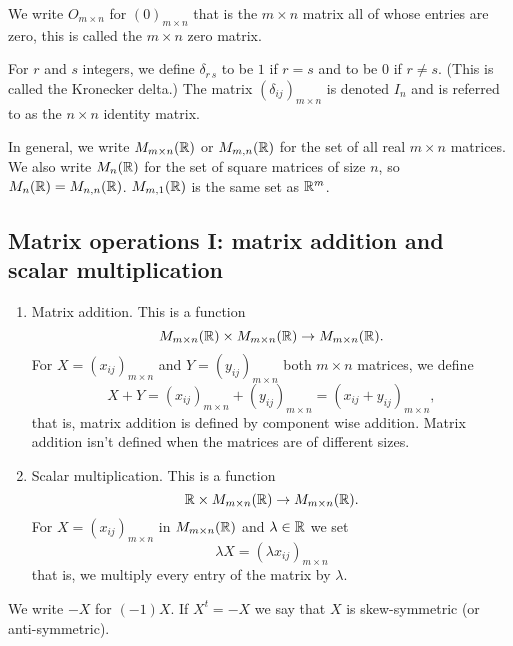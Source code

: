 \documentclass[10pt, a4paper]{article}
\begin{document}
We write $O_{m \times n}$ for $(0)_{m \times n}$ that is the $m \times n$ matrix all of whose entries are zero, this is called the $m \times n$ zero matrix.

For $r$ and $s$ integers, we define $\delta_{r\,s}$ to be $1$ if $r = s$ and to be $0$ if $r \neq s$. (This is called the Kronecker delta.) The matrix $(\delta_{ij})_{m \times n}$ is denoted $I_n$ and is referred to as the $n \times n$ identity matrix.

In general, we write $M_{m \times n}(\mathbb{R})$ or $M_{m, n}(\mathbb{R})$ for the set of all real $m \times n$ matrices. We also write $M_n(\mathbb{R})$ for the set of square matrices of size $n$, so $M_n(\mathbb{R}) = M_{n, n}(\mathbb{R})$. $M_{m, 1}(\mathbb{R})$ is the same set as $\mathbb{R} ^ m$.

\subsection{Matrix operations I: matrix addition and scalar multiplication}

\begin{enumerate}[label = (\roman*)]
    \item Matrix addition. This is a function
    \[
    M_{m \times n}(\mathbb{R}) \times M_{m \times n}(\mathbb{R}) \rightarrow M_{m \times n}(\mathbb{R}).
    \]
    For $X = (x_{ij})_{m \times n}$ and $Y = (y_{ij})_{m \times n}$ both $m \times n$ matrices, we define
    \[
    X + Y = (x_{ij})_{m \times n} + (y_{ij})_{m \times n} = (x_{ij} + y_{ij})_{m \times n},
    \]
    that is, matrix addition is defined by component wise addition. Matrix addition isn't defined when the matrices are of different sizes.
    \item Scalar multiplication. This is a function
    \[
    \mathbb{R} \times M_{m \times n}(\mathbb{R}) \rightarrow M_{m \times n}(\mathbb{R}).
    \]
    For $X = (x_{ij})_{m \times n}$ in $M_{m \times n}(\mathbb{R})$ and $\lambda \in \mathbb{R}$ we set
    \[
    \lambda X = (\lambda x_{ij})_{m \times n}
    \]
    that is, we multiply every entry of the matrix by $\lambda$.
\end{enumerate}

We write $-X$ for $(-1)X$. If $X ^ t = -X$ we say that $X$ is skew-symmetric (or anti-symmetric).
\end{document}
